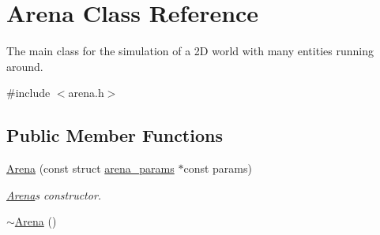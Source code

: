 \hypertarget{classArena}{}\section{Arena Class Reference}
\label{classArena}


The main class for the simulation of a 2D world with many entities running around.  




{\ttfamily \#include $<$arena.\+h$>$}

\subsection*{Public Member Functions}
\begin{DoxyCompactItemize}
\item 
\hyperlink{classArena_ac442d519facc5feebfd7612a53817e9a}{Arena} (const struct \hyperlink{structarena__params}{arena\+\_\+params} $\ast$const params)
\begin{DoxyCompactList}\small\item\em \hyperlink{classArena}{Arena}\textquotesingle{}s constructor. \end{DoxyCompactList}\item 
\hyperlink{classArena_ae21b399e9e3f6b8ac4ecc44d7d1667fc}{$\sim$\+Arena} ()\hypertarget{classArena_ae21b399e9e3f6b8ac4ecc44d7d1667fc}{}\label{classArena_ae21b399e9e3f6b8ac4ecc44d7d1667fc}


\end{DoxyCompactItemize}
